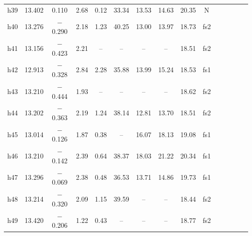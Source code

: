 \documentclass[11pt]{article}
\begin{document}
\begin{table}[htbp]
{\begin{tabular}{lcccccccccccccc}
 h39 &13.402 &   0.110   & 2.68 &0.12  & 33.34   & 13.53 & 14.63& 20.35 &N  \\
 h40 &13.276 &  $-$0.290 & 2.18 &1.23  & 40.25   & 13.00 & 13.97& 18.73 &fs2  \\
 h41 &13.156 &  $-$0.423 & 2.21 & --   &  --	 & --    &   -- & 18.51 &fs2  \\
 h42 &12.913 &  $-$0.328 & 2.84 &2.28  & 35.88   & 13.99 & 15.24& 18.53 &fs1  \\
 h43 &13.210 &  $-$0.444 & 1.93 & --   &  --	 & --    &   -- & 18.62 &fs2  \\
 h44 &13.202 &  $-$0.363 & 2.19 &1.24  & 38.14   & 12.81 & 13.70& 18.51 &fs2  \\
 h45 &13.014 &  $-$0.126 & 1.87 &0.38  & --	 & 16.07 & 18.13& 19.08 &fs1  \\
 h46 &13.210 &  $-$0.142 & 2.39 &0.64  & 38.37   & 18.03 & 21.22& 20.34 &fs1  \\
 h47 &13.296 &  $-$0.069 & 2.38 &0.48  & 36.53   & 13.71 & 14.86& 19.73 &fs1  \\
 h48 &13.214 &  $-$0.320 & 2.09 &1.15  & 39.59   &  --   &   -- & 18.44 &fs2  \\
 h49 &13.420 &  $-$0.206 & 1.22 &0.43  & --	 &  --   &   -- & 18.77 &fs2   \\
 
 \hline          
\end{tabular}
}
\end{table}
\end{document}

